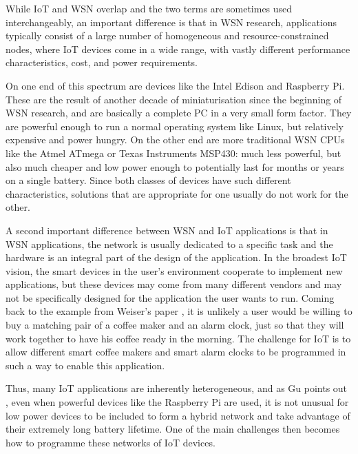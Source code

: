 While IoT and WSN overlap and the two terms are sometimes used interchangeably, an important difference is that in WSN research, applications typically consist of a large number of homogeneous and resource-constrained nodes, where IoT devices come in a wide range, with vastly different performance characteristics, cost, and power requirements.

On one end of this spectrum are devices like the Intel Edison and Raspberry Pi. These are the result of another decade of miniaturisation since the beginning of WSN research, and are basically a complete PC in a very small form factor. They are powerful enough to run a normal operating system like Linux, but relatively expensive and power hungry. On the other end are more traditional WSN CPUs like the Atmel ATmega or Texas Instruments MSP430: much less powerful, but also much cheaper and low power enough to potentially last for months or years on a single battery. Since both classes of devices have such different characteristics, solutions that are appropriate for one usually do not work for the other.

A second important difference between WSN and IoT applications is that in WSN applications, the network is usually dedicated to a specific task and the hardware is an integral part of the design of the application. In the broadest IoT vision, the smart devices in the user's environment cooperate to implement new applications, but these devices may come from many different vendors and may not be specifically designed for the application the user wants to run. Coming back to the example from Weiser's paper \cite{Weiser:1991wz}, it is unlikely a user would be willing to buy a matching pair of a coffee maker and an alarm clock, just so that they will work together to have his coffee ready in the morning. The challenge for IoT is to allow different smart coffee makers and smart alarm clocks to be programmed in such a way to enable this application.

Thus, many IoT applications are inherently heterogeneous, and as Gu points out \cite{Gu:2006ww}, even when powerful devices like the Raspberry Pi are used, it is not unusual for low power devices to be included to form a hybrid network and take advantage of their extremely long battery lifetime. One of the main challenges then becomes how to programme these networks of IoT devices.



